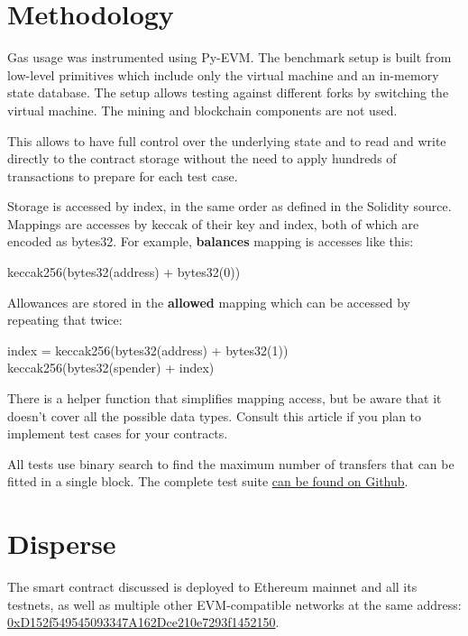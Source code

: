 \documentclass[12pt]{article}
\begin{document}
\section{Methodology}

Gas usage was instrumented using Py-EVM\cite{pyevm}.
The benchmark setup is built from low-level primitives which include only the virtual machine and an in-memory state database.
The setup allows testing against different forks by switching the virtual machine.
The mining and blockchain components are not used.

This allows to have full control over the underlying state and to read and write directly to the contract storage without the need to apply hundreds of transactions to prepare for each test case.

Storage is accessed by index, in the same order as defined in the Solidity source.
Mappings are accesses by keccak of their key and index, both of which are encoded as bytes32.
For example, \textbf{balances} mapping is accesses like this:
\begin{center}
	keccak256(bytes32(address) + bytes32(0))	
\end{center}

Allowances are stored in the \textbf{allowed} mapping which can be accessed by repeating that twice:
\begin{center}
index = keccak256(bytes32(address) + bytes32(1)) \\
keccak256(bytes32(spender) + index)	
\end{center}

There is a helper function that simplifies mapping access, but be aware that it doesn't cover all the possible data types.
Consult this article\cite{read-storage} if you plan to implement test cases for your contracts.

All tests use binary search to find the maximum number of transfers that can be fitted in a single block.
The complete test suite \href{https://github.com/banteg/disperse-reseach}{can be found on Github}.

\section{Disperse}

The smart contract discussed is deployed to Ethereum mainnet and all its testnets, as well as multiple other EVM-compatible networks at the same address: \href{https://etherscan.io/address/0xD152f549545093347A162Dce210e7293f1452150}{0xD152f549545093347A162Dce210e7293f1452150}.
\end{document}
